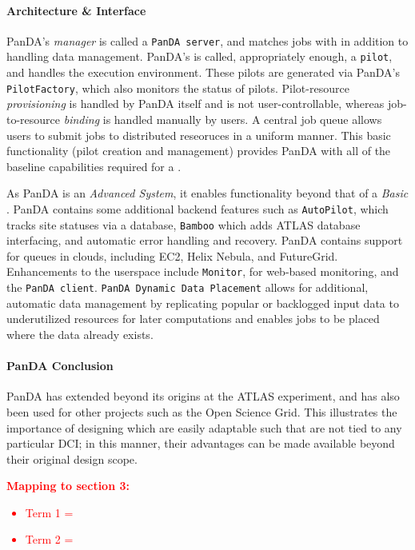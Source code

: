 \documentclass{sig-alternate}
\begin{document}
\paragraph{Architecture \& Interface}
PanDA's \textit{manager} is called a \texttt{PanDA server}, and matches
jobs with \pilots in addition to handling data management.
PanDA's \textit{\pilot}
is called, appropriately enough, a \texttt{pilot}, and handles the execution
environment.  These pilots are generated via PanDA's \texttt{PilotFactory},
which also monitors the status of pilots.
Pilot-resource \textit{provisioning} is handled by PanDA itself and is not
user-controllable, whereas job-to-resource \textit{binding} is handled
manually by users.
A central job queue allows users to submit jobs
to distributed reseoruces in a uniform manner.  
This basic functionality (pilot creation and management) provides
PanDA with all of the baseline capabilities required for a \pilotjob.

As PanDA is an \textit{Advanced \pilotjob System}, it enables functionality
beyond that of a \textit{Basic \pilotjob}.
PanDA contains some additional backend features such as \texttt{AutoPilot}, which
tracks site statuses via a database, \texttt{Bamboo} which adds
ATLAS database interfacing, and automatic error handling and recovery. 
PanDA contains support for queues in clouds, including EC2, Helix Nebula,
and FutureGrid.
Enhancements to the userspace include
\texttt{Monitor}, for web-based monitoring, and the \texttt{PanDA client}.
\texttt{PanDA Dynamic Data Placement} \cite{maeno_pd2p:_2012}
allows for additional, automatic data
management by replicating popular or backlogged input data to underutilized resources
for later computations and enables jobs to be placed where the data
already exists.


\paragraph{PanDA Conclusion}
PanDA has extended beyond its origins at the ATLAS experiment, and has also been used for other projects such
as the Open Science Grid.  This illustrates the importance of designing
\pilotjobs which are easily adaptable such that \pilots are not tied
to any particular DCI; in this manner, their advantages can be made
available beyond their original design scope.

\textcolor{red}
{
\textbf{Mapping to section 3:}
\begin{itemize}
\item Term 1 =
\item Term 2 =
\end{itemize}
}
\end{document}
